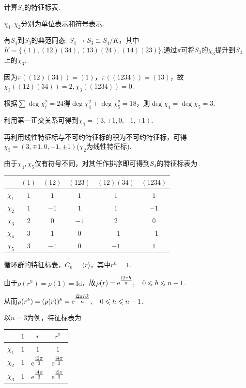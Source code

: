 \begin{instance}
    计算$S_4$的特征标表.\par
    $\chi_1, \chi_2$分别为单位表示和符号表示.\par
    有$S_4$到$S_3$的典范同态: $S_4 \to S_3 \cong S_4/K$，其中$K = \{(1), (12)(34), (13)(24), (14)(23)\}$.通过$\pi$可将$S_3$的$\chi_3$提升到$S_4$上的$\chi_3$.\par
    因为$\pi((12)(34))=(1)$，$\pi((1234))=(13)$，故$\chi_3((12)(34))=2, \chi_3((1234))=0$.\par
    根据$\sum \deg \chi_i^2 = 24$得$\deg \chi_4^2 + \deg \chi_5^2 = 18$，则$\deg \chi_4 = \deg \chi_5 = 3$.\par
    利用第一正交关系可得到$\chi_4=(3,\pm 1,0,-1,\mp 1)$.\par
    再利用线性特征标与不可约特征标的积为不可约特征标，可得$\chi_5 = (3, \mp 1, 0, -1, \pm 1)$($\chi_2$为线性特征标).\par
    由于$\chi_4,\chi_5$仅有符号不同，对其任作排序即可得到$S_4$的特征标表为
    \begin{center}
        \begin{tabular}{c|ccccc}
                     & $(1)$ & $(12)$ & $(123)$ & $(12)(34)$ & $(1234)$ \\ \hline
            $\chi_1$ & $1$   & $1$    & $1$     & $1$        & $1$      \\
            $\chi_2$ & $1$   & $-1$   & $1$     & $1$        & $-1$     \\
            $\chi_3$ & $2$   & $0$    & $-1$    & $2$        & $0$      \\
            $\chi_4$ & $3$   & $1$    & $0$     & $-1$       & $-1$     \\
            $\chi_5$ & $3$   & $-1$   & $0$     & $-1$       & $1$
        \end{tabular}
    \end{center}
\end{instance}

\begin{instance}
    循环群的特征标表，$C_n = \langle r \rangle$，其中$r^n = 1$.\par
    由于$\rho(r^n) = \rho(1) = \mathrm{Id}$，故$\rho(r) = \mathrm{e}^{\tfrac{\mathrm{i} 2\pi h}{n}}, \quad 0 \leqslant h \leqslant n-1$.\par
    从而$\rho(r^k) = (\rho(r))^k = \mathrm{e}^{\tfrac{\mathrm{i} 2\pi h k}{n}}, \quad 0 \leqslant h \leqslant n-1$.\par
    以$n=3$为例，特征标表为
    \begin{center}
        \begin{tabular}{c|ccc}
                     & $1$ & $r$ & $r^2$ \\ \hline
            $\chi_1$ & $1$ & $1$ & $1$ \\
            $\chi_2$ & $1$ & $\mathrm{e}^{\tfrac{\mathrm{i} 2\pi}{3}}$ & $\mathrm{e}^{\tfrac{\mathrm{i} 4\pi}{3}}$ \\
            $\chi_3$ & $1$ & $\mathrm{e}^{\tfrac{\mathrm{i} 4\pi}{3}}$ & $\mathrm{e}^{\tfrac{\mathrm{i} 2\pi}{3}}$
        \end{tabular}
    \end{center}
\end{instance}

